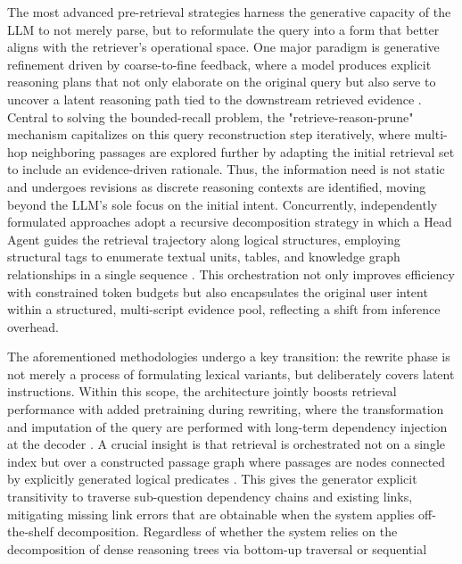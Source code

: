 \documentclass[11pt,a4paper]{article}
\begin{document}
The most advanced pre-retrieval strategies harness the generative capacity of the LLM to not merely parse, but to reformulate the query into a form that better aligns with the retriever's operational space. One major paradigm is generative refinement driven by coarse-to-fine feedback, where a model produces explicit reasoning plans that not only elaborate on the original query but also serve to uncover a latent reasoning path tied to the downstream retrieved evidence \cite{arxiv:2601.04618v2}. Central to solving the bounded-recall problem, the "retrieve-reason-prune" mechanism \cite{arxiv:2604.27577v1} capitalizes on this query reconstruction step iteratively, where multi-hop neighboring passages are explored further by adapting the initial retrieval set to include an evidence-driven rationale. Thus, the information need is not static and undergoes revisions as discrete reasoning contexts are identified, moving beyond the LLM's sole focus on the initial intent. Concurrently, independently formulated approaches adopt a recursive decomposition strategy in which a Head Agent guides the retrieval trajectory along logical structures, employing structural tags to enumerate textual units, tables, and knowledge graph relationships in a single sequence \cite{arxiv:2510.20505v4}. This orchestration not only improves efficiency with constrained token budgets but also encapsulates the original user intent within a structured, multi-script evidence pool, reflecting a shift from inference overhead.

The aforementioned methodologies undergo a key transition: the rewrite phase is not merely a process of formulating lexical variants, but deliberately covers latent instructions. Within this scope, the architecture jointly boosts retrieval performance with added pretraining during rewriting, where the transformation and imputation of the query are performed with long-term dependency injection at the decoder \cite{arxiv:2607.21333v1}. A crucial insight is that retrieval is orchestrated not on a single index but over a constructed passage graph where passages are nodes connected by explicitly generated logical predicates \cite{arxiv:2502.12442v2}. This gives the generator explicit transitivity to traverse sub-question dependency chains and existing links, mitigating missing link errors that are obtainable when the system applies off-the-shelf decomposition. Regardless of whether the system relies on the decomposition of dense reasoning trees via bottom-up traversal \cite{arxiv:2601.11255v1} or sequential
\end{document}
